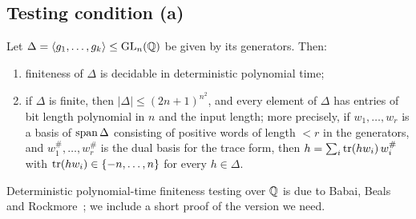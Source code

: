 \subsection{Testing condition (a)}\label{ssec:atest}
\begin{lemma}[Finiteness]\label{lem:finite}
Let $\Delta=\langle g_1,\ldots,g_k\rangle\le\mathrm{GL}_n(\mathbb{Q})$ be given by its generators. Then:
\begin{enumerate}
\item finiteness of $\Delta$ is decidable in deterministic polynomial time;
\item if $\Delta$ is finite, then $|\Delta|\le(2n+1)^{n^2}$, and every element of $\Delta$ has entries
of bit length polynomial in $n$ and the input length; more precisely, if $w_1,\ldots,w_r$ is a basis
of $\operatorname{span}\Delta$ consisting of positive words of length $<r$ in the generators, and
$w_1^\#,\ldots,w_r^\#$ is the dual basis for the trace form, then
$h=\sum_i\operatorname{tr}(hw_i)\,w_i^\#$ with $\operatorname{tr}(hw_i)\in\{-n,\ldots,n\}$ for every $h\in\Delta$.
\end{enumerate}
\end{lemma}
Deterministic polynomial-time finiteness testing over $\mathbb{Q}$ is due to Babai, Beals and
Rockmore~\cite{BBR93}; we include a short proof of the version we need.

